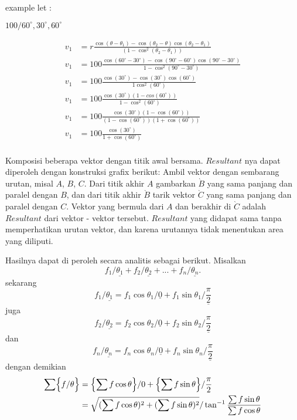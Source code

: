 \documentclass{article}
\begin{document}
example let :

$100/60^\circ, 30^\circ, 60^\circ$


\begin{align*}
v_1 &= r\frac{\cos(\theta - \theta_1) - \cos(\theta_2 - \theta)\cos(\theta_2 - \theta_1) }{(1 - \cos^2(\theta_2 - \theta_1))}\\
v_1 &= 100\frac{\cos(60^\circ-30^\circ) - \cos(90^\circ - 60^\circ)\cos(90^\circ - 30^\circ)}{1 - \cos^2(90^\circ - 30^\circ)}\\
v_1 &= 100\frac{\cos(30^\circ) - \cos(30^\circ)\cos(60^\circ)}{1 \cos^2(60^\circ)}\\
v_1 &= 100\frac{\cos(30^\circ)(1-cos(60^\circ))}{1-\cos^2(60^\circ)}\\
v_1 &= 100\frac{\cos(30^\circ)(1-\cos(60^\circ))}{(1-\cos(60^\circ))(1+\cos(60^\circ))}\\
v_1 &= 100\frac{\cos(30^\circ)}{1+\cos(60^\circ)}\\
\end{align*}

Komposisi beberapa vektor dengan titik awal bersama. $Resultant$ nya dapat 
diperoleh dengan konstruksi grafix berikut: Ambil vektor dengan sembarang 
urutan, misal $A$, $B$, $C$. Dari titik akhir $A$ gambarkan $\grave{B}$ yang 
sama panjang dan paralel dengan $B$, dan dari titik akhir $\grave{B}$ tarik 
vektor $\grave{C}$ yang sama panjang dan paralel dengan $C$. Vektor yang 
bermula dari $A$ dan berakhir di $\grave{C}$ adalah $Resultant$ dari 
vektor - vektor tersebut. $Resultant$ yang didapat sama tanpa memperhatikan 
urutan vektor, dan karena urutannya tidak menentukan area yang diliputi.

Hasilnya dapat di peroleh secara analitis sebagai berikut.
Misalkan 
\[
f_1/\underline{\theta_1} + f_2/\underline{\theta_2} +  ... + f_n/\underline{\theta_n}.
\]
sekarang
\[
f_1/\underline{\theta_1} = f_1\cos\theta_1/\underline{0} + f_1\sin\theta_1/\underline{\frac{\pi}{2}} 
\]
juga
\[
f_2/\underline{\theta_2} = f_2\cos\theta_2/\underline{0} + f_2\sin\theta_2/\underline{\frac{\pi}{2}} 
\]
dan
\[
f_n/\underline{\theta_n} = f_n\cos\theta_n/\underline{0} + f_n\sin\theta_n/\underline{\frac{\pi}{2}} 
\]
dengan demikian
\begin{align*}
\sum\Bigl\lbrace f/\theta \Bigr\rbrace &= \Bigl\lbrace \sum{f \cos\theta}\Bigr\rbrace/0 + \Bigl\lbrace\sum{f \sin\theta}\Bigr\rbrace/\frac{\pi}{2}\\
&=\sqrt{(\sum{f \cos\theta})^2 + (\sum{f \sin \theta})^2}/\tan^{-1}\frac{\sum f \sin \theta}{\sum f \cos \theta}
\end{align*}
\end{document}

